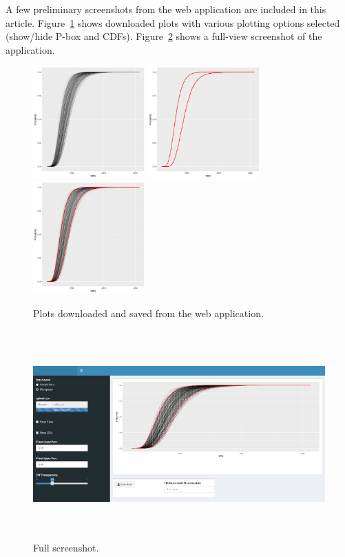 \documentclass[11pt]{asaproc}\usepackage[]{graphicx}\usepackage[]{color}
\begin{document}
A few preliminary screenshots from the web application are included in this article. Figure~\ref{dwnld_plt} shows downloaded plots with various plotting options selected (show/hide P-box and CDFs). Figure~\ref{full} shows a full-view screenshot of the application.  

\begin{figure}[t]
\begin{center} 
\includegraphics[height=4.3cm,width=4.3cm]{figures2/dwnld_plt_cdfs.png}
\includegraphics[height=4.3cm,width=4.3cm]{figures2/dwnld_plt_pbx.png}
\includegraphics[height=4.3cm,width=4.3cm]{figures2/dwnld_plt.png} 
\end{center} 
\caption{\label{dwnld_plt}Plots downloaded and saved from the web application.}
\end{figure}

\begin{figure}[t]
\begin{center} 
\includegraphics[height=8cm,width=15.5cm]{figures2/SS_full.png}
\end{center} 
\caption{\label{full}Full screenshot.}
\end{figure}
\end{document}
